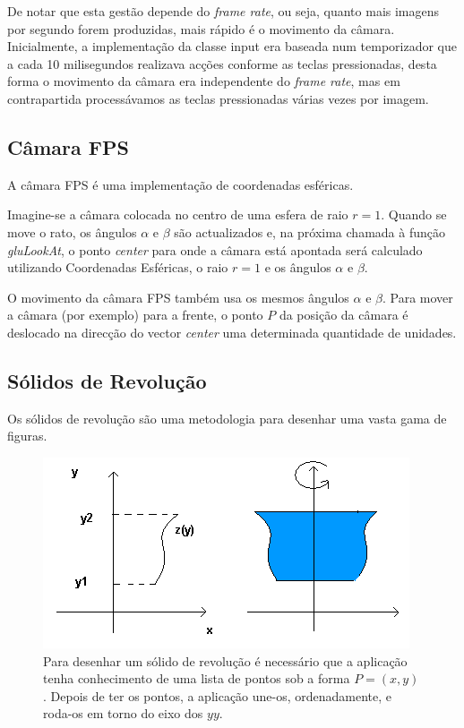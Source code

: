 \documentclass[a5paper,onecolumn, 11pt]{article}
\begin{document}
De notar que esta gestão depende do \textit{frame rate}, ou seja, quanto mais imagens por segundo forem produzidas, mais rápido é o movimento da câmara. Inicialmente, a implementação da classe input era baseada num temporizador que a cada 10 milisegundos realizava acções conforme as teclas pressionadas, desta forma o movimento da câmara era independente do \textit{frame rate}, mas em contrapartida processávamos as teclas pressionadas várias vezes por imagem.

\subsection{Câmara FPS} \label{camara fps}
A câmara FPS é uma implementação de coordenadas esféricas.

Imagine-se a câmara colocada no centro de uma esfera de raio $r=1$. Quando se move o rato, os ângulos $\alpha$ e $\beta$ são actualizados e, na próxima chamada à função \textit{gluLookAt}, o ponto \textit{center} para onde a câmara está apontada será calculado utilizando Coordenadas Esféricas, o raio $r=1$ e os ângulos $\alpha$ e $\beta$.

O movimento da câmara FPS também usa os mesmos ângulos $\alpha$ e $\beta$. Para mover a câmara (por exemplo) para a frente, o ponto $P$ da posição da câmara é deslocado na direcção do vector \textit{center} uma determinada quantidade de unidades.

\subsection{Sólidos de Revolução} \label{SolidosRevolucao}
Os sólidos de revolução são uma metodologia para desenhar uma vasta gama de figuras.

\begin{figure}[!htb]
    \centering
    \includegraphics[scale=0.5]{solidoRev.png}
    \caption[Demonstração de Sólido de Revolução]{Para desenhar um sólido de revolução é necessário que a aplicação tenha conhecimento de uma lista de pontos sob a forma \hbox{$P=(x,y)$}. Depois de ter os pontos, a aplicação une-os, ordenadamente, e roda-os em torno do eixo dos $yy$.}
\end{figure}
\end{document}

